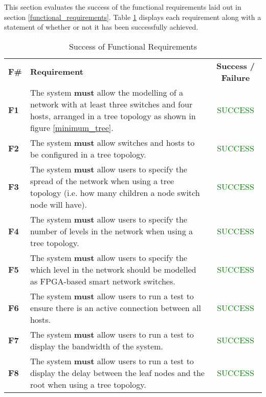 
This section evaluates the success of the functional requirements laid out in section \ref{functional_requirements}. Table \ref{evaluation_functional_requirements_table} displays each requirement along with a statement of whether or not it has been successfully achieved.

\begin{center}
  \begin{longtable}{|l|p{9cm}|c|}
    \caption{Success of Functional Requirements} \\ \hline
    \label{evaluation_functional_requirements_table}
    \textbf{F\#} & \textbf{Requirement} & \textbf{Success / Failure} \\ \thickhline
    \textbf{F1} & The system \textbf{must} allow the modelling of a network with at least three switches and four hosts, arranged in a tree topology as shown in figure \ref{minimum_tree}. & \textcolor{green}{SUCCESS} \\ \hline
    \textbf{F2} & The system \textbf{must} allow switches and hosts to be configured in a tree topology. & \textcolor{green}{SUCCESS} \\ \hline
    \textbf{F3} & The system \textbf{must} allow users to specify the spread of the network when using a tree topology (i.e. how many children a node switch node will have). & \textcolor{green}{SUCCESS} \\ \hline
    \textbf{F4} & The system \textbf{must} allow users to specify the number of levels in the network when using a tree topology. & \textcolor{green}{SUCCESS} \\ \hline
    \textbf{F5} & The system \textbf{must} allow users to specify the which level in the network should be modelled as FPGA-based smart network switches. & \textcolor{green}{SUCCESS} \\ \hline
    \textbf{F6} & The system \textbf{must} allow users to run a test to ensure there is an active connection between all hosts. & \textcolor{green}{SUCCESS} \\ \hline
    \textbf{F7} & The system \textbf{must} allow users to run a test to display the bandwidth of the system. & \textcolor{green}{SUCCESS} \\ \hline
    \textbf{F8} & The system \textbf{must} allow users to run a test to display the delay between the leaf nodes and the root when using a tree topology. & \textcolor{green}{SUCCESS} \\ \hline

\end{longtable}
\end{center}
